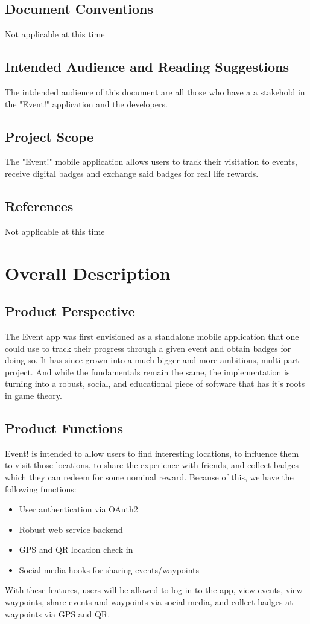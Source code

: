 \documentclass{scrreprt}
\begin{document}
\section{Document Conventions}
Not applicable at this time

\section{Intended Audience and Reading Suggestions}
The intdended audience of this document are all those who have a a stakehold in
the "Event!" application and the developers.

\section{Project Scope}
The "Event!" mobile application allows users to track their visitation to events,
receive digital badges and exchange said badges for real life rewards.

\section{References}
Not applicable at this time

\chapter{Overall Description}

\section{Product Perspective}
The Event app was first envisioned as a standalone mobile application that one
could use to track their progress through a given event and obtain badges for doing so.
It has since grown into a much bigger and more ambitious, multi-part project. And while the
fundamentals remain the same, the implementation is turning into a robust, social, and 
educational piece of software that has it's roots in game theory.

\section{Product Functions}
Event! is intended to allow users to find interesting locations, to influence them 
to visit those locations, to share the experience with friends, and collect badges 
which they can redeem for some nominal reward. Because of this, we have the 
following functions: 
\begin{itemize}
\item User authentication via OAuth2
\item Robust web service backend
\item GPS and QR location check in
\item Social media hooks for sharing events/waypoints
\end{itemize}
With these features, users will be allowed to log in to the app, view events, 
view waypoints, share events and waypoints via social media, and collect 
badges at waypoints via GPS and QR.
\end{document}
